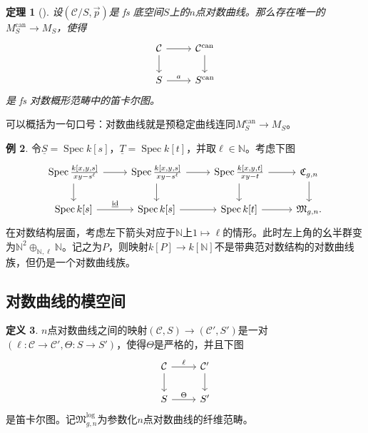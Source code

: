 \documentclass{amsart}
\newtheorem{thm}{定理}[section]
\theoremstyle{definition}
\newtheorem{defn}[thm]{定义}
\newtheorem{exm}[thm]{例}
\theoremstyle{remark}
\theoremstyle{plain}
\theoremstyle{definition}
\theoremstyle{remark}
\newcommand{\N}{\mathbb{N}}
\newcommand{\mc}[1]{\mathcal{#1}}
\newcommand{\mf}[1]{\mathfrak{#1}}
\newcommand{\on}[1]{\operatorname{#1}}
\newcommand{\ul}[1]{\underline{#1}}
\newcommand{\1}{\mathbf{1}}
\newcommand{\2}{\mathbf{2}}
\newcommand{\3}{\mathbf{3}}
\DeclareMathOperator{\Spec}{Spec}
\begin{document}
\begin{thm}[{\cite{FKato2000}}]
    设\((\mc{C}/S, \vec{p})\)是 fs 底空间\(S\)上的\(n\)点对数曲线。那么存在唯一的\(M_S^{\on{can}} \to M_S\)，使得
    \begin{equation*}
    \begin{tikzcd}
        \mc{C} \ar{d} \ar{r} & \mc{C}^{\on{can}} \ar{d} \\
        S \ar{r}{a} & S^{\on{can}}
    \end{tikzcd}
    \end{equation*}
    是 fs 对数概形范畴中的笛卡尔图。
\end{thm}

可以概括为一句口号：对数曲线就是预稳定曲线连同\(M_S^{\on{can}} \to M_S\)。

\begin{exm}
    令\(\ul{S} = \Spec k[s]\)，\(\ul{T} = \Spec k[t]\)，并取\(\ell \in \N\)。考虑下图
    \begin{equation*}
    \begin{tikzcd}
        \Spec \frac{k{ [x,y,s] }}{xy-s^{\ell}} \ar{d} \ar{r} & \Spec \frac{k{ [x,y,s] }}{xy-s^{\ell}} \ar{d} \ar{r} & \Spec  \frac{k{[x,y,t]}}{xy-t} \ar{r}\ar{d} & \mf{C}_{g,n} \ar{d} \\
        \Spec k{[s]} \ar{r}{\ul{ \on{id} }} & \Spec {k[s]} \ar{r} & \Spec k{[t]} \ar{r} & \mf{M}_{g,n}.
    \end{tikzcd}
    \end{equation*}
    在对数结构层面，考虑左下箭头对应于\(\N\)上\(1 \mapsto \ell\)的情形。此时左上角的幺半群变为\(\N^2 \oplus_{\N, \ell} \N\)。记之为\(P\)，则映射\(k[P] \to k[\N]\)不是带典范对数结构的对数曲线族，但仍是一个对数曲线族。
\end{exm}

\subsection{对数曲线的模空间}%
\label{sub:Moduli of log curves}

\begin{defn}
    \(n\)点对数曲线之间的映射\((\mc{C}, S) \to (\mc{C}', S')\)是一对\((\ell \colon \mc{C} \to \mc{C}', \Theta \colon S \to S')\)，使得\(\Theta\)是严格的，并且下图
    \begin{equation*}
    \begin{tikzcd}
        \mc{C} \ar{d} \ar{r}{\ell} & \mc{C}' \ar{d} \\
        S \ar{r}{\Theta} & S'
    \end{tikzcd}
    \end{equation*}
    是笛卡尔图。记\(\mf{M}_{g,n}^{\log}\)为参数化\(n\)点对数曲线的纤维范畴。
\end{defn}
\end{document}
